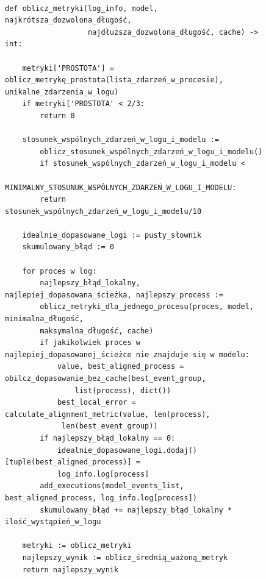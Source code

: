\clearpage
\begin{figure}[!ht]
\lstset{caption=Obliczanie metryk, captionpos=b}
\lstset{label=src:best_result, frame=single}
\begin{lstlisting}

def oblicz_metryki(log_info, model, najkrótsza_dozwolona_długość, 
                   najdłuższa_dozwolona_długość, cache) -> int:
                   
    metryki['PROSTOTA'] = oblicz_metrykę_prostota(lista_zdarzeń_w_procesie), unikalne_zdarzenia_w_logu)
    if metryki['PROSTOTA' < 2/3:
        return 0

    stosunek_wspólnych_zdarzeń_w_logu_i_modelu := 
        oblicz_stosunek_wspólnych_zdarzeń_w_logu_i_modelu()		   
        if stosunek_wspólnych_zdarzeń_w_logu_i_modelu <
            MINIMALNY_STOSUNUK_WSPÓLNYCH_ZDARZEŃ_W_LOGU_I_MODELU:
        return stosunek_wspólnych_zdarzeń_w_logu_i_modelu/10
        
    idealnie_dopasowane_logi := pusty_słownik
    skumulowany_błąd := 0
    
    for proces w log:
        najlepszy_błąd_lokalny, najlepiej_dopasowana_ścieżka, najlepszy_process := 
      	oblicz_metryki_dla_jednego_procesu(proces, model, minimalna_długość, 
      	maksymalna_długość, cache)
    	if jakikolwiek proces w najlepiej_dopasowanej_ścieżce nie znajduje się w modelu:
            value, best_aligned_process = obilcz_dopasowanie_bez_cache(best_event_group, 
                list(process), dict())
            best_local_error = calculate_alignment_metric(value, len(process),
             len(best_event_group))
        if najlepszy_błąd_lokalny == 0:
            idealnie_dopasowane_logi.dodaj()[tuple(best_aligned_process)] = 
            log_info.log[process]
        add_executions(model_events_list, best_aligned_process, log_info.log[process])
        skumulowany_błąd += najlepszy_błąd_lokalny * ilość_wystąpień_w_logu

	metryki := oblicz_metryki 
	najlepszy_wynik := oblicz_średnią_ważoną_metryk
    return najlepszy_wynik
\end{lstlisting}
\end{figure}

